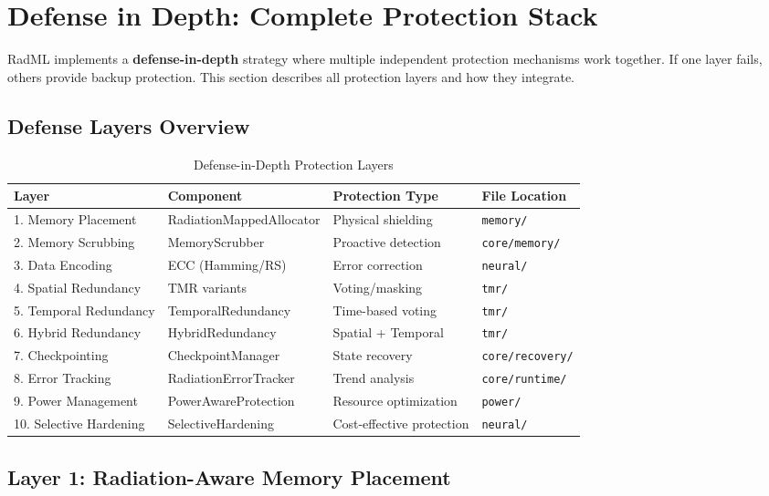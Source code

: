 \documentclass[11pt,a4paper]{article}
\begin{document}
\newpage
\section{Defense in Depth: Complete Protection Stack}

RadML implements a \textbf{defense-in-depth} strategy where multiple independent protection mechanisms work together. If one layer fails, others provide backup protection. This section describes all protection layers and how they integrate.

\subsection{Defense Layers Overview}

\begin{table}[htbp]
\centering
\caption{Defense-in-Depth Protection Layers}
\begin{tabular}{@{}llll@{}}
\toprule
\textbf{Layer} & \textbf{Component} & \textbf{Protection Type} & \textbf{File Location} \\
\midrule
1. Memory Placement & RadiationMappedAllocator & Physical shielding & \texttt{memory/} \\
2. Memory Scrubbing & MemoryScrubber & Proactive detection & \texttt{core/memory/} \\
3. Data Encoding & ECC (Hamming/RS) & Error correction & \texttt{neural/} \\
4. Spatial Redundancy & TMR variants & Voting/masking & \texttt{tmr/} \\
5. Temporal Redundancy & TemporalRedundancy & Time-based voting & \texttt{tmr/} \\
6. Hybrid Redundancy & HybridRedundancy & Spatial + Temporal & \texttt{tmr/} \\
7. Checkpointing & CheckpointManager & State recovery & \texttt{core/recovery/} \\
8. Error Tracking & RadiationErrorTracker & Trend analysis & \texttt{core/runtime/} \\
9. Power Management & PowerAwareProtection & Resource optimization & \texttt{power/} \\
10. Selective Hardening & SelectiveHardening & Cost-effective protection & \texttt{neural/} \\
\bottomrule
\end{tabular}
\end{table}

\subsection{Layer 1: Radiation-Aware Memory Placement}
\end{document}

